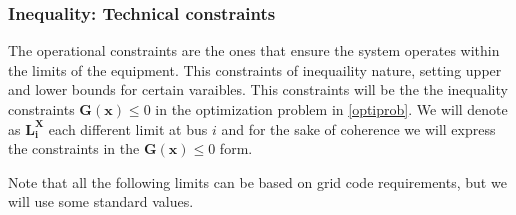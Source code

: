 \documentclass[a4paper,11pt, titlepage, twoside]{article}
\begin{document}




\subsubsection{Inequality: Technical constraints}\label{inequality}

The operational constraints are the ones that ensure the system operates within the limits of the equipment. This constraints of inequaility nature, setting 
upper and lower bounds for certain varaibles. This constraints will be the the inequality constraints $\mathbf{G(x)} \leq 0$ in the optimization problem in \ref{optiprob}. We will
denote as $\mathbf{L_i^X}$ each different limit at bus $i$ and for the sake of coherence we will express the constraints in the $\mathbf{G(x)} \leq 0$ form.\par
Note that all the following limits can be based on grid code requirements, but we will use some standard values.
\end{document}
